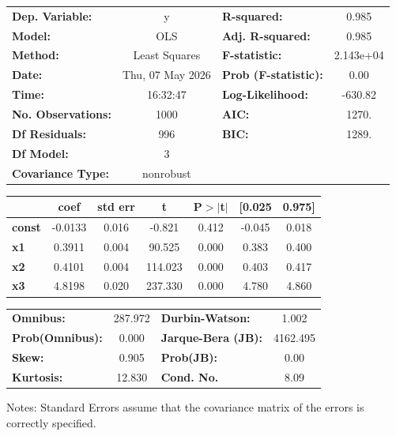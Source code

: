 \begin{center}
\begin{tabular}{lclc}
\toprule
\textbf{Dep. Variable:}    &        y         & \textbf{  R-squared:         } &     0.985   \\
\textbf{Model:}            &       OLS        & \textbf{  Adj. R-squared:    } &     0.985   \\
\textbf{Method:}           &  Least Squares   & \textbf{  F-statistic:       } & 2.143e+04   \\
\textbf{Date:}             & Thu, 07 May 2026 & \textbf{  Prob (F-statistic):} &     0.00    \\
\textbf{Time:}             &     16:32:47     & \textbf{  Log-Likelihood:    } &   -630.82   \\
\textbf{No. Observations:} &        1000      & \textbf{  AIC:               } &     1270.   \\
\textbf{Df Residuals:}     &         996      & \textbf{  BIC:               } &     1289.   \\
\textbf{Df Model:}         &           3      & \textbf{                     } &             \\
\textbf{Covariance Type:}  &    nonrobust     & \textbf{                     } &             \\
\bottomrule
\end{tabular}
\begin{tabular}{lcccccc}
               & \textbf{coef} & \textbf{std err} & \textbf{t} & \textbf{P$> |$t$|$} & \textbf{[0.025} & \textbf{0.975]}  \\
\midrule
\textbf{const} &      -0.0133  &        0.016     &    -0.821  &         0.412        &       -0.045    &        0.018     \\
\textbf{x1}    &       0.3911  &        0.004     &    90.525  &         0.000        &        0.383    &        0.400     \\
\textbf{x2}    &       0.4101  &        0.004     &   114.023  &         0.000        &        0.403    &        0.417     \\
\textbf{x3}    &       4.8198  &        0.020     &   237.330  &         0.000        &        4.780    &        4.860     \\
\bottomrule
\end{tabular}
\begin{tabular}{lclc}
\textbf{Omnibus:}       & 287.972 & \textbf{  Durbin-Watson:     } &    1.002  \\
\textbf{Prob(Omnibus):} &   0.000 & \textbf{  Jarque-Bera (JB):  } & 4162.495  \\
\textbf{Skew:}          &   0.905 & \textbf{  Prob(JB):          } &     0.00  \\
\textbf{Kurtosis:}      &  12.830 & \textbf{  Cond. No.          } &     8.09  \\
\bottomrule
\end{tabular}
\end{center}

Notes: \newline
 [1] Standard Errors assume that the covariance matrix of the errors is correctly specified.